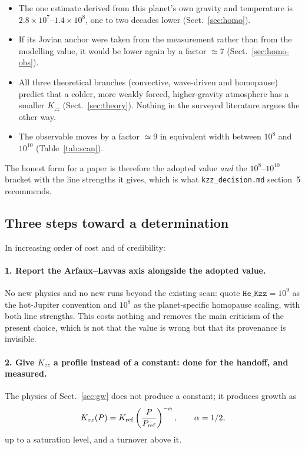 \documentclass[english,a4paper]{my_memo}
\begin{document}
\begin{itemize}
\item The one estimate derived from this planet's own gravity and
      temperature is $2.8\times10^{7}$--$1.4\times10^{8}$, one to two
      decades lower (Sect.~\ref{sec:homo}).
\item If its Jovian anchor were taken from the measurement rather than from
      the modelling value, it would be lower again by a factor $\simeq 7$
      (Sect.~\ref{sec:homo-obs}).
\item All three theoretical branches (convective, wave-driven and
      homopause) predict that a colder, more weakly forced, higher-gravity
      atmosphere has a smaller $K_{zz}$ (Sect.~\ref{sec:theory}). Nothing in
      the surveyed literature argues the other way.
\item The observable moves by a factor $\simeq 9$ in equivalent width
      between $10^{8}$ and $10^{10}$ (Table~\ref{tab:scan}).
\end{itemize}

The honest form for a paper is therefore the adopted value \emph{and} the
$10^{8}$--$10^{10}$ bracket with the line strengths it gives, which is what
\texttt{kzz\_decision.md} section~5 recommends.

\subsection{Three steps toward a determination}
\label{sec:next}

In increasing order of cost and of credibility:

\paragraph{1. Report the Arfaux--Lavvas axis alongside the adopted value.}
No new physics and no new runs beyond the existing scan: quote
$\texttt{He\_Kzz} = 10^{9}$ as the hot-Jupiter convention and
$10^{8}$ as the planet-specific homopause scaling, with both line
strengths. This costs nothing and removes the main criticism of the present
choice, which is not that the value is wrong but that its provenance is
invisible.

\paragraph{2. Give $K_{zz}$ a profile instead of a constant: done for the
handoff, and measured.} The physics of Sect.~\ref{sec:gw} does not produce a
constant; it produces growth as
%
\begin{equation}
  K_{zz}(P) = K_{\rm ref} \left(\frac{P}{P_{\rm ref}}\right)^{-\alpha},
  \qquad \alpha = 1/2 ,
  \label{eq:kzzpow}
\end{equation}
%
up to a saturation level, and a turnover above it.
\end{document}

